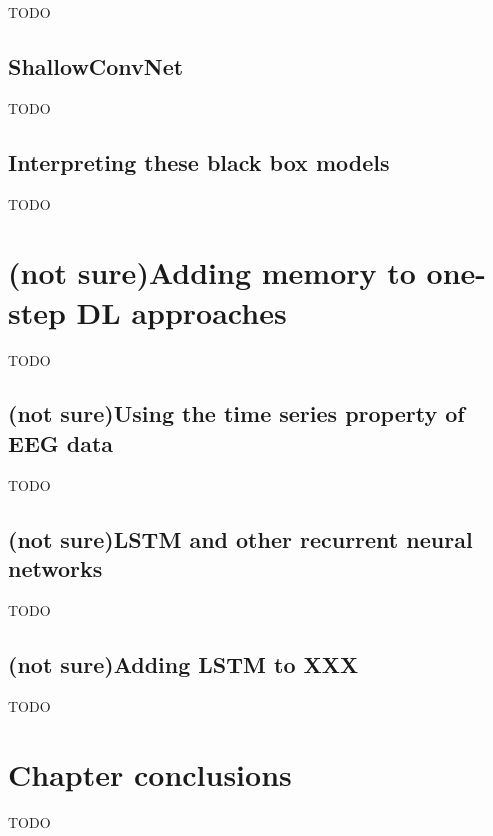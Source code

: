 TODO


\subsection{ShallowConvNet}
\label{subsec:offline_bci_system_one_step_dl_shallowconvnet}

TODO


\subsection{Interpreting these black box models}
\label{subsec:offline_bci_system_one_step_dl_interpreting}

TODO

\section{(not sure)Adding memory to one-step DL approaches}
\label{sec:offline_bci_system_rnn}

TODO


\subsection{(not sure)Using the time series property of EEG data}
\label{subsec:offline_bci_system_rnn_why_rnn}

TODO


\subsection{(not sure)LSTM and other recurrent neural networks}
\label{subsec:offline_bci_system_rnn_lstm_explained}

TODO


\subsection{(not sure)Adding LSTM to XXX}
\label{subsec:offline_bci_system_rnn_lstm_implementation}

TODO

\section{Chapter conclusions}
\label{sec:offline_bci_summary}

TODO